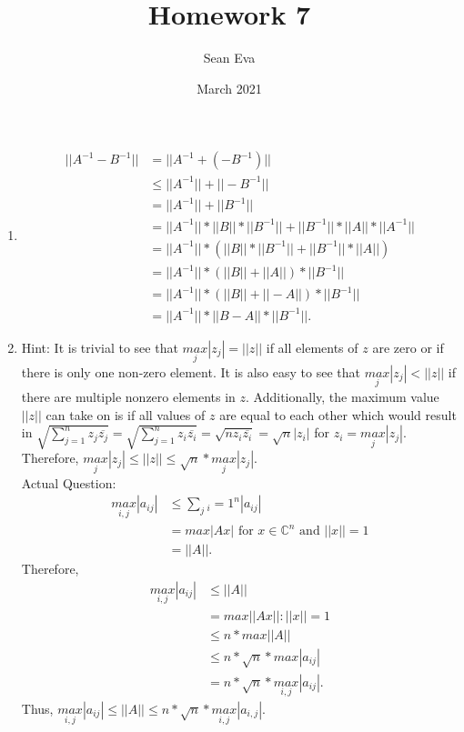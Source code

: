 \documentclass{article}
\title{Homework 7}
\author{Sean Eva}
\date{March 2021}
\begin{document}
\maketitle

\begin{enumerate}
    \item 
    
    \begin{align*}
        ||A^{-1}-B^{-1}|| &= ||A^{-1} + (-B^{-1})||\\
        &\leq ||A^{-1}||+||-B^{-1}||\\
        &= ||A^{-1}||+||B^{-1}||\\
        &= ||A^{-1}||*||B||*||B^{-1}||+||B^{-1}||*||A||*||A^{-1}||\\
        &= ||A^{-1}||*(||B||*||B^{-1}||+||B^{-1}||*||A||)\\
        &= ||A^{-1}||*(||B||+||A||)*||B^{-1}||\\
        &= ||A^{-1}||*(||B||+||-A||)*||B^{-1}||\\
        &= ||A^{-1}||*||B-A||*||B^{-1}||.
    \end{align*}
    
    \item
    
    Hint: It is trivial to see that $\underset{j}{max}|z_j|=||z||$ if all elements of $z$ are zero or if there is only one non-zero element. It is also easy to see that $\underset{j}{max}|z_j|<||z||$ if there are multiple nonzero elements in $z$. Additionally, the maximum value $||z||$ can take on is if all values of $z$ are equal to each other which would result in $\sqrt{\sum_{j=1}^nz_j\overline{z_j}}=\sqrt{\sum_{j=1}^nz_i\overline{z_i}}=\sqrt{nz_i\overline{z_i}}=\sqrt{n}|z_i|$ for $z_i=\underset{j}{max}|z_j|$. Therefore, $\underset{j}{max}|z_j|\leq||z||\leq\sqrt{n}*\underset{j}{max}|z_j|$.\\
    Actual Question: 
    \begin{align*}
        \underset{i, j}{max}|a_{ij}| &\leq \underset{j}\sum{_i=1}^n|a_{ij}|\\
        &=max|Ax| \text{ for } x\in\mathbb{C}^n \text{ and } ||x||=1\\
        &= ||A||.
    \end{align*} Therefore,
    \begin{align*}
        \underset{i, j}{max}|a_{ij}| &\leq ||A||\\
        &=max{||Ax||:||x||=1}\\
        &\leq n*max||A||\\
        &\leq n*\sqrt{n}*max|a_{ij}|\\
        &=n*\sqrt{n}*\underset{i, j}{max}|a_{ij}|.
    \end{align*} Thus, $\underset{i, j}{max}|a_{ij}|\leq ||A||\leq n*\sqrt{n}*\underset{i, j}{max}|a_{i, j}|.$
    

\end{enumerate}
\end{document}
